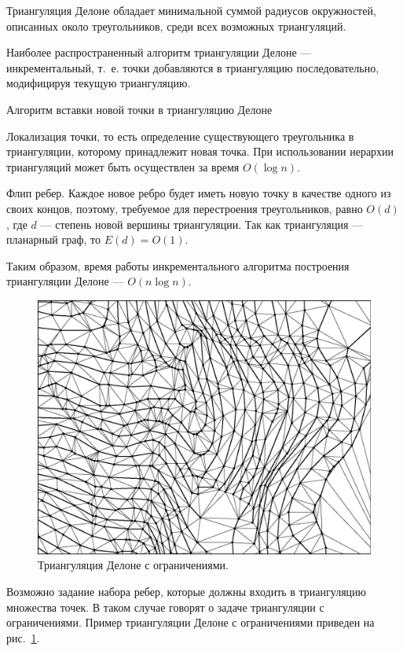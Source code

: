 \begin{theorem}
  Триангуляция Делоне обладает минимальной суммой радиусов
  окружностей, описанных около треугольников, среди всех возможных
  триангуляций.
\end{theorem}

Наиболее распространенный алгоритм триангуляции Делоне ---
инкрементальный, т.~е. точки добавляются в триангуляцию
последовательно, модифицируя текущую триангуляцию.
\begin{algorithm}{Алгоритм вставки новой точки в триангуляцию Делоне}
\item Локализация точки, то есть определение существующего
  треугольника в триангуляции, которому принадлежит новая точка. При
  использовании иерархии триангуляций может быть осуществлен за время
  $O(\log n)$.
\item Флип ребер. Каждое новое ребро будет иметь новую точку в
  качестве одного из своих концов, поэтому, требуемое для перестроения
  треугольников, равно $O(d)$, где $d$ --- степень новой вершины
  триангуляции. Так как триангуляция --- планарный граф, то $E(d)=O(1)$.
\end{algorithm}
Таким образом, время работы инкрементального алгоритма построения
триангуляции Делоне --- $O(n\log n)$.

\begin{figure}
  \centering
  \includegraphics{cdt.ps}
  \caption{Триангуляция Делоне с ограничениями.}
  \label{fig:cdt}
\end{figure}

Возможно задание набора ребер, которые должны входить в триангуляцию
множества точек. В таком случае говорят о задаче триангуляции с
ограничениями. Пример триангуляции Делоне с ограничениями приведен на рис.~\ref{fig:cdt}.

